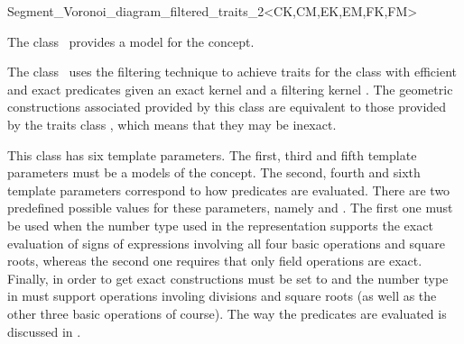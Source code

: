 


\begin{ccRefClass}
{Segment_Voronoi_diagram_filtered_traits_2<CK,CM,EK,EM,FK,FM>}


\ccDefinition
  
The class \ccRefName\ provides a model for the
 concept.

The class \ccRefName\ uses the filtering technique \cite{cgal:bbp-iayed-01}
to achieve traits for the 
class with efficient and exact predicates given an exact
kernel  and a filtering kernel . The geometric
constructions associated provided by this class are equivalent
to those provided by the traits class
, which means that
they may be inexact.

This class has six template parameters. The first, third and fifth
template parameters must be a models of the  concept. The
second, fourth and sixth template parameters correspond to how
predicates are evaluated. There are two predefined possible values for
these parameters, namely  and
. The first one must be used when the number type
used in the representation supports the exact evaluation of signs of
expressions involving all four basic operations and square roots,
whereas the second one requires that only field operations are
exact. Finally, in order to get exact constructions 
must be set to  and the number type in
 must support operations involing divisions and square roots
(as well as the other three basic operations of course).
%
The way the predicates are evaluated is discussed in
\cite{b-ecvdl-96,cgal:k-reisv-04}.


\end{ccRefClass}
